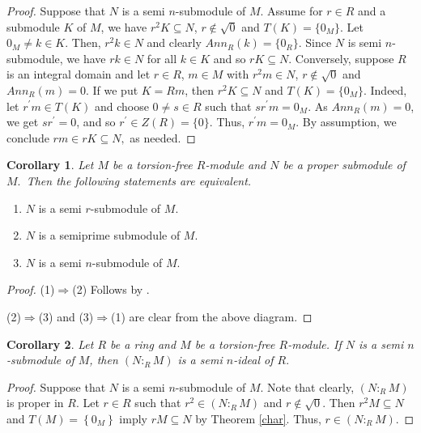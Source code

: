 \documentclass{amsart}%
\theoremstyle{plain}
\newtheorem{corollary}{Corollary}
\numberwithin{equation}{section}
\begin{document}
\begin{proof}
Suppose that $N$ is a semi $n$-submodule of $M$. Assume for $r\in R$ and a
submodule $K$ of $M$, we have $r^{2}K\subseteq N$, $r\notin\sqrt{0}$ and
$T(K)=\{0_{M}\}$. Let $0_{M}\neq k\in K.$ Then, $r^{2}k\in N$ and clearly
$Ann_{R}(k)=\{0_{R}\}.$ Since $N$ is semi $n$-submodule, we have $rk\in N$ for
all $k\in K$ and so $rK\subseteq N.$ Conversely, suppose $R$ is an integral
domain and let $r\in R$, $m\in M$ with $r^{2}m\in N$, $r\notin\sqrt{0}$ and
$Ann_{R}(m)=0$. If we put $K=Rm$, then $r^{2}K\subseteq N$ and $T(K)=\{0_{M}%
\}.$ Indeed, let $r^{\prime}m\in T(K)$ and choose $0\neq s\in R$ such that
$sr^{\prime}m=0_{M}$. As $Ann_{R}(m)=0$, we get $sr^{\prime}=0$, and so
$r^{\prime}\in Z(R)=\{0\}.$ Thus, $r^{\prime}m=0_{M}$. By assumption, we
conclude $rm\in rK\subseteq N,$ as needed.
\end{proof}

\begin{corollary}
\label{corr}Let $M$ be a torsion-free $R$-module and $N$ be a proper submodule
of $M.$\ Then the following statements are equivalent.
\end{corollary}

\begin{enumerate}
\item $N$ is a semi $r$-submodule of $M.$

\item $N$ is a semiprime submodule of $M.$

\item $N$ is a semi $n$-submodule of $M.$
\end{enumerate}

\begin{proof}
(1)$\Rightarrow$(2) Follows by \cite[Proposition 7]{HE4}.

(2)$\Rightarrow$(3) and (3)$\Rightarrow$(1) are clear from the above diagram.
\end{proof}

\begin{corollary}
\label{(N:M)2}Let $R$ be a ring and $M$ be a torsion-free $R$-module. If $N$
is a semi $n$-submodule of $M$, then $(N:_{R}M)$ is a semi $n$-ideal of $R.$
\end{corollary}

\begin{proof}
Suppose that $N$ is a semi $n$-submodule of $M$. Note that clearly,
$(N:_{R}M)$ is proper in $R$. Let $r\in R$ such that $r^{2}\in(N:_{R}M)$ and
$r\notin\sqrt{0}.$ Then $r^{2}M\subseteq N$ and $T(M)=\left\{  0_{M}\right\}
$ imply $rM\subseteq N$ by Theorem \ref{char}. Thus, $r\in(N:_{R}M)$.
\end{proof}
\end{document}
